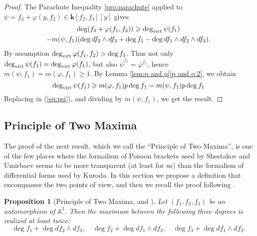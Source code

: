 \documentclass[reqno,oneside,11pt]{amsart}
\theoremstyle{plain}
\newtheorem{proposition}[theorem]{Proposition}
\theoremstyle{definition}
\newcommand{\A}{{\mathbb{A}}}
\newcommand{\K}{\mathbf{k}}
\renewcommand{\phi}{\varphi}
\newcommand{\dvirt}{\deg_{\text{\rm virt}}}
\newcommand{\topcomp}[2]{\overline{#1}^{#2}}
\renewcommand{\ge}{\geqslant}
\begin{document}
\begin{proof}
The Parachute Inequality \ref{pro:parachute} applied to $\psi = f_3 + \phi(y,f_2) \in \K[f_2,f_3][y]$ gives
\begin{multline}
\label{eq:psi}
\deg (f_3 + \phi(f_1,f_2)) \ge \dvirt \psi(f_1) \\
- m(\psi,f_1)(\deg df_2\wedge df_3 + \deg f_1 - \deg df_1\wedge df_2\wedge df_3 ).
\end{multline}
By assumption $\dvirt\phi(f_1,f_2) > \deg f_3$.
Thus not only $\dvirt \psi(f_1) = \dvirt \phi(f_1)$, but also 
$\topcomp{\psi}{f_1} = \topcomp{\phi}{f_1}$, hence $m(\psi,{f_1}) = m(\phi,{f_1}) \ge 1$.
By Lemma \ref{lem:p and q}\ref{p and q:2}, we obtain
$$\dvirt \psi(f_1) \ge m(\phi,f_1) p \deg f_1 = m(\psi,f_1) p \deg f_1$$
Replacing in (\ref{eq:psi}), and dividing by $m(\psi,f_1)$, we get the result.
\end{proof}

\subsection{Principle of Two Maxima}

The proof of the next result, which we call the ``Principle of Two Maxima'', is one of the few places where the formalism of Poisson brackets used by Shestakov and Umirbaev seems to be more transparent (at least for us) than the formalism of differential forms used by Kuroda.
In this section we propose a definition that encompasses the two points of view, and then we recall the proof following \cite[Lemma 5]{SU:ineq}.

\begin{proposition}[Principle of Two Maxima, {\cite[Theorem 5.2]{Ku:ineq} and \cite[Lemma 5]{SU:ineq}}]
\label{pro:ptm}
Let $(f_1, f_2, f_3)$ be an automorphism of $\A^3$.
Then the maximum between the following three degrees is realized at least twice:
$$\deg f_1 + \deg df_2 \wedge df_3,\quad
\deg f_2 + \deg df_1 \wedge df_3, \quad
\deg f_3 + \deg df_1 \wedge df_2. $$
\end{proposition}
\end{document}
